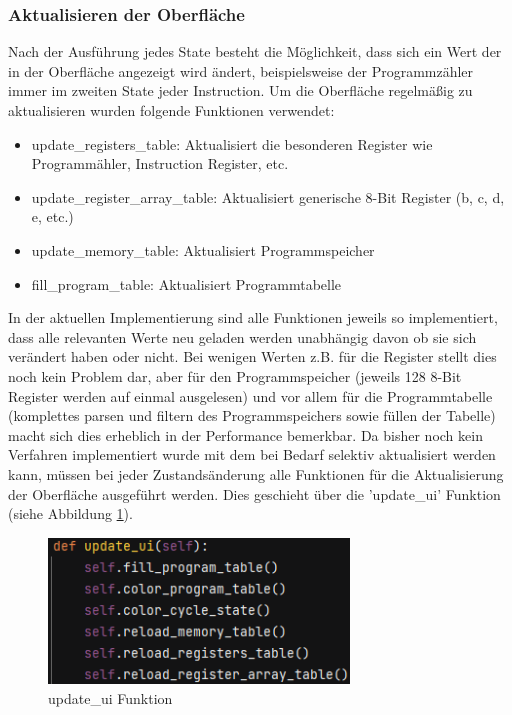\documentclass[12pt]{article}
\newcommand{\imgSpaceBefore}{\vspace{10pt}}
\begin{document}
\subsubsection{Aktualisieren der Oberfläche}
Nach der Ausführung jedes State besteht die Möglichkeit, dass sich ein Wert der in der Oberfläche angezeigt wird ändert, beispielsweise der Programmzähler immer im zweiten State jeder Instruction. Um die Oberfläche regelmäßig zu aktualisieren wurden folgende Funktionen verwendet:\imgSpaceBefore

\begin{itemize}
	\item update\_registers\_table: Aktualisiert die besonderen Register wie Programmähler, Instruction Register, etc.
	\item update\_register\_array\_table: Aktualisiert generische 8-Bit Register (b, c, d, e, etc.)
	\item update\_memory\_table: Aktualisiert Programmspeicher
	\item fill\_program\_table: Aktualisiert Programmtabelle
\end{itemize}
\noindent
In der aktuellen Implementierung sind alle Funktionen jeweils so implementiert, dass alle relevanten Werte neu geladen werden unabhängig davon ob sie sich verändert haben oder nicht. Bei wenigen Werten z.B. für die Register stellt dies noch kein Problem dar, aber für den Programmspeicher (jeweils 128 8-Bit Register werden auf einmal ausgelesen) und vor allem für die Programmtabelle (komplettes parsen und filtern des Programmspeichers sowie füllen der Tabelle) macht sich dies erheblich in der Performance bemerkbar. Da bisher noch kein Verfahren implementiert wurde mit dem bei Bedarf selektiv aktualisiert werden kann, müssen bei jeder Zustandsänderung alle Funktionen für die Aktualisierung der Oberfläche ausgeführt werden. Dies geschieht über die 'update\_ui' Funktion (siehe Abbildung \ref{fig:updateUI}).\imgSpaceBefore

\begin{figure}[H]
\centering
\includegraphics[width=8cm]{bilder/updateUI}
\caption{update\_ui Funktion}
\label{fig:updateUI}
\end{figure}
\end{document}
